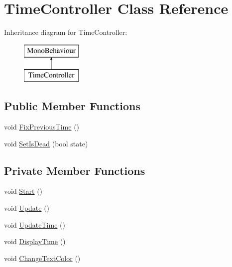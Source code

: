 \hypertarget{class_time_controller}{}\section{Time\+Controller Class Reference}
\label{class_time_controller}
Inheritance diagram for Time\+Controller\+:\begin{figure}[H]
\begin{center}
\leavevmode
\includegraphics[height=2.000000cm]{class_time_controller}
\end{center}
\end{figure}
\subsection*{Public Member Functions}
\begin{DoxyCompactItemize}
\item 
void \mbox{\hyperlink{class_time_controller_a6692282e48cb8eb9a4bf10d130d9c17a}{Fix\+Previous\+Time}} ()
\item 
void \mbox{\hyperlink{class_time_controller_a153403da1e9de2e547c7931ce044be7f}{Set\+Is\+Dead}} (bool state)
\end{DoxyCompactItemize}
\subsection*{Private Member Functions}
\begin{DoxyCompactItemize}
\item 
void \mbox{\hyperlink{class_time_controller_ae2531258e75cb1af4c09edd88a89d147}{Start}} ()
\item 
void \mbox{\hyperlink{class_time_controller_a4b60f339ab4270f1bf015d4a44083184}{Update}} ()
\item 
void \mbox{\hyperlink{class_time_controller_ad911152a7d332d8458803fdca5475a24}{Update\+Time}} ()
\item 
void \mbox{\hyperlink{class_time_controller_aaa0e1ce02dd37efd2811ff87906955ef}{Display\+Time}} ()
\item 
void \mbox{\hyperlink{class_time_controller_aa4f1e53477ee98721d237e6e1136ff0d}{Change\+Text\+Color}} ()
\end{DoxyCompactItemize}
